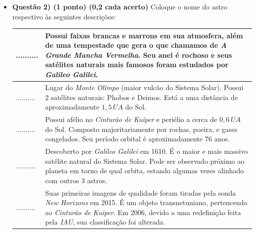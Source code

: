 \documentclass[a4paper, 12pt]{article}
\begin{document}
\begin{itemize}
		\item \textbf{Questão 2) (1 ponto) (0,2 cada acerto)} Coloque o nome do astro respectivo às seguintes descrições:
			\begin{center} \begin{tabular}{|M{0.2\textwidth}|M{0.65\textwidth}|}
				\hline
				.......... & Possui faixas brancas e marrons em sua atmosfera, além de uma tempestade que gera o que chamamos de \textit{A Grande Mancha Vermelha}. Seu anel é rochoso e seus satélites naturais mais famosos foram estudados por \textit{Galileo Galilei}. \\ \hline
				.......... & Lugar do \textit{Monte Olímpo} (maior vulcão do Sistema Solar). Possui 2 satélites naturais: Phobos e Deimos. Está a uma distância de aproximadamente $1,5 \, UA$ do Sol. \\ \hline
				.......... & Possui afélio no \textit{Cinturão de Kuiper} e periélio a cerca de $0,6 \, UA$ do Sol. Composto majoritariamente por rochas, poeira, e gases congelados. Seu período orbital é aproximadamente $76$ anos. \\ \hline
				.......... & Descoberto por \textit{Galileo Galilei} em 1610. É o maior e mais massivo satélite natural do Sistema Solar. Pode ser observado próximo ao planeta em torno de qual orbita, estando algumas vezes alinhado com outros 3 astros.  \\ \hline
				.......... & Suas primeiras imagens de qualidade foram tiradas pela sonda \textit{New Horizons} em 2015. É um objeto transnetuniano, pertencendo ao \textit{Cinturão de Kuiper}. Em 2006, devido a uma redefinição feita pela \textit{IAU}, sua classificação foi alterada. \\ \hline
			\end{tabular} \end{center}
		

\end{itemize}
\end{document}

